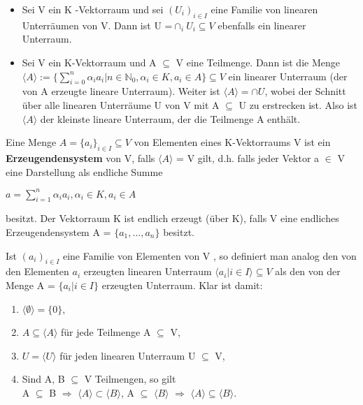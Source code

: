 \begin{lemma}
\leavevmode
\begin{itemize}
\item Sei V ein K -Vektorraum und sei $(U_i )_{i \in I}$ eine Familie von linearen Unterräumen von V. Dann ist U =$\cap_i U_i \subseteq V$ ebenfalls ein linearer Unterraum.
\item Sei V ein K-Vektorraum und A $\subseteq$ V eine Teilmenge. Dann ist die Menge $\langle A \rangle := \big\{ \sum\nolimits_{i=0}^{n} \alpha_i a_i | n \in \mathbb{N}_0, \alpha_i \in K, a_i \in A \big\} \subseteq V$ ein linearer Unterraum (der von A erzeugte lineare Unterraum). Weiter ist $\langle A \rangle = \cap U$, wobei der Schnitt über alle linearen Unterräume U von V mit A $\subseteq$ U zu erstrecken ist. Also ist $\langle A \rangle$ der kleinste lineare Unterraum, der die Teilmenge A enthält.
\end{itemize}
\end{lemma}

\begin{definition}
Eine Menge $A = \{a_i\}_{i \in I} \subseteq V$ von Elementen eines K-Vektorraums V ist ein \textbf{Erzeugendensystem} von V, falls $\langle A \rangle$ = V gilt, d.h. falls jeder Vektor a $\in$ V eine Darstellung als endliche Summe
\begin{center}
$a = \sum\nolimits_{i=1}^{n}\alpha_i a_i, \alpha_i \in K, a_i \in A$
\end{center}
besitzt. Der Vektorraum K ist endlich erzeugt (über K), falls V eine endliches Erzeugendensystem A = $\{a_1, …, a_n\}$ besitzt.
\end{definition}

\begin{remark} 
Ist $(a_i)_{i \in I}$ eine Familie von Elementen von V , so definiert man analog den von den Elementen $a_i$ erzeugten linearen Unterraum $\langle a_i | i \in I \rangle \subseteq V$ als den von der Menge A = $\{a_i | i \in I\}$ erzeugten Unterraum. Klar ist 
damit:
\begin{enumerate}
\item $\langle \emptyset \rangle = \{0\}$,
\item $A \subseteq \langle A \rangle$ für jede Teilmenge A $\subseteq$ V, 
\item $U = \langle U \rangle$ für jeden linearen Unterraum U $\subseteq$ V, 
\item Sind A, B $\subseteq$ V Teilmengen, so gilt\\ 
A $\subseteq$ B $\Rightarrow$ $\langle A \rangle \subset \langle B \rangle$, \hspace*{3mm}
A $\subseteq$ $\langle B \rangle$ $\Rightarrow$ $\langle A \rangle \subseteq \langle B \rangle$.
\end{enumerate} 
\end{remark}

